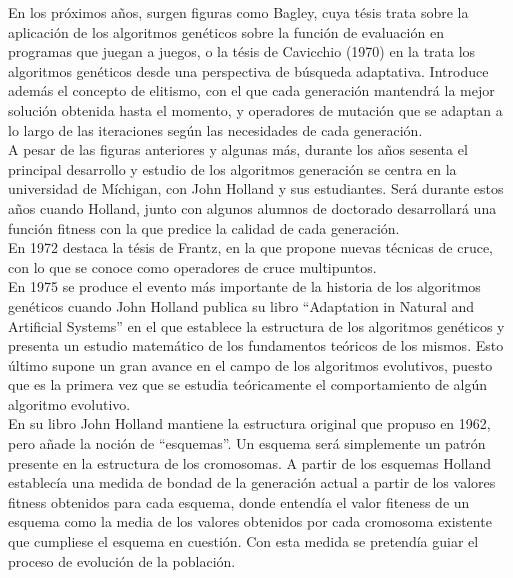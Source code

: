 \documentclass[12pt]{article} \usepackage[utf8x]{inputenc}
\begin{document}
En los próximos años, surgen figuras como Bagley, cuya tésis trata sobre la 
aplicación de los algoritmos genéticos sobre la función de evaluación en 
programas que juegan a juegos, o la tésis de Cavicchio (1970) en la trata 
los algoritmos genéticos desde una perspectiva de búsqueda adaptativa. 
Introduce además el concepto de elitismo, con el que cada generación mantendrá 
la mejor solución obtenida hasta el momento, y operadores de mutación que se 
adaptan a lo largo de las iteraciones según las necesidades de cada generación.\\

A pesar de las figuras anteriores y algunas más, durante los años sesenta el 
principal desarrollo y estudio de los algoritmos generación se centra en la 
universidad de Míchigan, con John Holland y sus estudiantes. Será durante estos 
años cuando Holland, junto con algunos alumnos de doctorado desarrollará una 
función fitness con la que predice la calidad de cada generación.\\

En 1972 destaca la tésis de Frantz, en la que propone nuevas técnicas de cruce, 
con lo que se conoce como operadores de cruce multipuntos.\\



En 1975 se produce el evento más importante de la historia de los algoritmos 
genéticos cuando John Holland publica su libro ``Adaptation in Natural and 
Artificial Systems'' en el que establece la estructura de los  algoritmos 
genéticos y presenta un estudio matemático de los fundamentos teóricos de los 
mismos. Esto último supone un gran avance en el campo de los algoritmos 
evolutivos, puesto que es la primera vez que se estudia teóricamente el 
comportamiento de algún algoritmo evolutivo.\\


En su libro John Holland mantiene la estructura original que propuso en 1962, 
pero añade la noción de ``esquemas''. Un esquema será simplemente un patrón 
presente en la estructura de los cromosomas. A partir de los esquemas  Holland 
establecía una medida de bondad de la generación actual a partir de los valores 
fitness obtenidos para cada esquema, donde entendía el valor fiteness de un 
esquema como la media de los valores obtenidos por cada cromosoma existente que 
cumpliese el esquema en cuestión. Con esta medida se pretendía guiar el proceso 
de evolución de la población. \\
\end{document}
